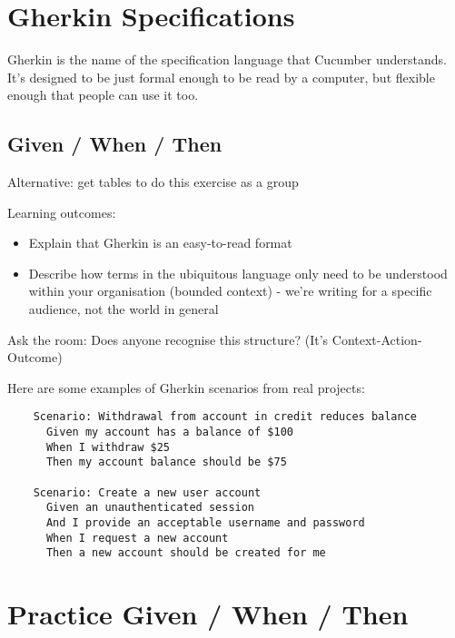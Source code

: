\chapter*{Gherkin Specifications}

\ifcontent

    Gherkin is the name of the specification language that Cucumber understands. It's designed to be just formal enough to be read by a computer, but flexible enough that people can use it too.
    
\fi 

\section*{Given / When / Then}

\ifnotes

    Alternative: get tables to do this exercise as a group

    Learning outcomes:
    
    \begin{itemize}
        \item Explain that Gherkin is an easy-to-read format
        \item Describe how terms in the ubiquitous language only need to be understood within your organisation (bounded context) - we're writing for a specific audience, not the world in general
    \end{itemize}
    
    
    Ask the room: Does anyone recognise this structure? (It's Context-Action-Outcome)

\fi

\ifcontent

    Here are some examples of Gherkin scenarios from real projects:

\begin{verbatim}
    Scenario: Withdrawal from account in credit reduces balance
      Given my account has a balance of $100
      When I withdraw $25
      Then my account balance should be $75
    
    Scenario: Create a new user account
      Given an unauthenticated session
      And I provide an acceptable username and password
      When I request a new account
      Then a new account should be created for me
\end{verbatim}

\fi

\chapter*{Practice Given / When / Then}

